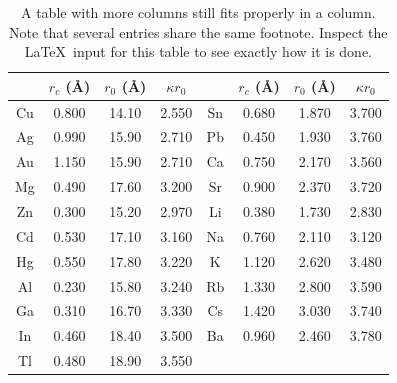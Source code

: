 \documentclass[aps,prl,twocolumn,superscriptaddress,groupedaddress]{revtex4}  %
\begin{document}
\begin{table}[b]
\caption{\label{tab:table2}A table with more columns still fits
properly in a column. Note that several entries share the same
footnote. Inspect the \LaTeX\ input for this table to see
exactly how it is done.}
\begin{ruledtabular}
\begin{tabular}{cccccccc}
 &$r_c$ (\AA)&$r_0$ (\AA)&$\kappa r_0$&
 &$r_c$ (\AA) &$r_0$ (\AA)&$\kappa r_0$\\
\hline
Cu& 0.800 & 14.10 & 2.550 &Sn\footnotemark[1]
& 0.680 & 1.870 & 3.700 \\
Ag& 0.990 & 15.90 & 2.710 &Pb\footnotemark[2]
& 0.450 & 1.930 & 3.760 \\
Au& 1.150 & 15.90 & 2.710 &Ca\footnotemark[3]
& 0.750 & 2.170 & 3.560 \\
Mg& 0.490 & 17.60 & 3.200 &Sr\footnotemark[4]
& 0.900 & 2.370 & 3.720 \\
Zn& 0.300 & 15.20 & 2.970 &Li\footnotemark[2]
& 0.380 & 1.730 & 2.830 \\
Cd& 0.530 & 17.10 & 3.160 &Na\footnotemark[5]
& 0.760 & 2.110 & 3.120 \\
Hg& 0.550 & 17.80 & 3.220 &K\footnotemark[5]
&  1.120 & 2.620 & 3.480 \\
Al& 0.230 & 15.80 & 3.240 &Rb\footnotemark[3]
& 1.330 & 2.800 & 3.590 \\
Ga& 0.310 & 16.70 & 3.330 &Cs\footnotemark[4]
& 1.420 & 3.030 & 3.740 \\
In& 0.460 & 18.40 & 3.500 &Ba\footnotemark[5]
& 0.960 & 2.460 & 3.780 \\
Tl& 0.480 & 18.90 & 3.550 & & & & \\
\end{tabular}
\end{ruledtabular}
\end{table}
\end{document}
